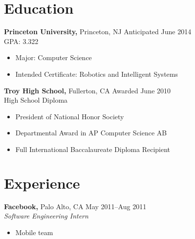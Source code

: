 \documentclass[margin]{res}
\begin{document}
 
 

\address{{\bf Present Address} \\ 3169 Frist Center \\ Princeton, NJ
  08544 \\ (714) 869-7503 \\ dan@dskang.com }

\address{{\bf Permanent Address} \\ 2507 Cypress Point Drive \\
  Fullerton, CA 92833 }

 
\begin{resume} 
 
\section{Education} 
 {\bf Princeton University,} Princeton, NJ \hfill Anticipated June
 2014 \\ GPA: 3.322
 \begin{itemize} \itemsep -2pt %
 \item Major: Computer Science
 \item Intended Certificate: Robotics and Intelligent Systems
 \end{itemize}

 {\bf Troy High School,} Fullerton, CA \hfill Awarded June 2010 \\
 High School Diploma
 \begin{itemize} \itemsep -2pt %
 \item President of National Honor Society
 \item Departmental Award in AP Computer Science AB
 \item Full International Baccalaureate Diploma Recipient
 \end{itemize}



\section{Experience}
 {\bf Facebook,} Palo Alto, CA \hfill May 2011--Aug 2011 \\
 {\it Software Engineering Intern}
 \begin{itemize} \itemsep -2pt  %
 \item Mobile team
 \end{itemize}


\end{resume}
\end{document}
